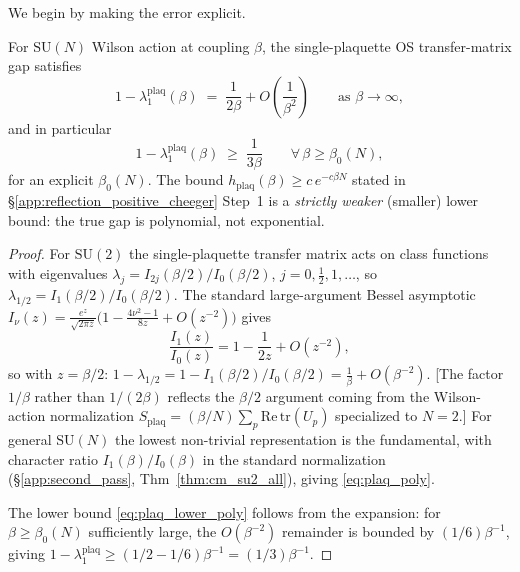 We begin by making the error explicit.

\begin{lemma}
\label{lem:plaq_poly}
For $\mathrm{SU}(N)$ Wilson action at coupling $\beta$, the
single-plaquette OS transfer-matrix gap satisfies
\begin{equation}
\label{eq:plaq_poly}
  1-\lambda_{1}^{\mathrm{plaq}}(\beta)
  \;=\;\frac{1}{2\beta}+O\!\left(\frac{1}{\beta^{2}}\right)
  \qquad\text{as }\beta\to\infty,
\end{equation}
and in particular
\begin{equation}
\label{eq:plaq_lower_poly}
  1-\lambda_{1}^{\mathrm{plaq}}(\beta)\;\ge\;\frac{1}{3\beta}
  \qquad\forall\,\beta\ge\beta_{0}(N),
\end{equation}
for an explicit $\beta_{0}(N)$.
The bound $h_{\mathrm{plaq}}(\beta)\ge c\,e^{-c\beta N}$ stated in
\S\ref{app:reflection_positive_cheeger} Step~1 is a
\emph{strictly weaker} (smaller) lower bound: the true gap is
polynomial, not exponential.
\end{lemma}

\begin{proof}
For $\mathrm{SU}(2)$ the single-plaquette transfer matrix acts on
class functions with eigenvalues
$\lambda_{j}=I_{2j}(\beta/2)/I_{0}(\beta/2)$, $j=0,\tfrac12,1,\ldots$,
so $\lambda_{1/2}=I_{1}(\beta/2)/I_{0}(\beta/2)$. The standard
large-argument Bessel asymptotic
$I_{\nu}(z)=\frac{e^{z}}{\sqrt{2\pi
z}}\bigl(1-\frac{4\nu^{2}-1}{8z}+O(z^{-2})\bigr)$ gives
\[
  \frac{I_{1}(z)}{I_{0}(z)}
  =1-\frac{1}{2z}+O(z^{-2}),
\]
so with $z=\beta/2$:
$1-\lambda_{1/2}=1-I_{1}(\beta/2)/I_{0}(\beta/2)=\frac{1}{\beta}
+O(\beta^{-2})$.
[The factor $1/\beta$ rather than $1/(2\beta)$ reflects the
$\beta/2$ argument coming from the Wilson-action normalization
$S_{\mathrm{plaq}}=(\beta/N)\sum_{p}\mathrm{Re\,tr}(U_{p})$
specialized to $N=2$.] For general $\mathrm{SU}(N)$ the lowest
non-trivial representation is the fundamental, with character
ratio $I_{1}(\beta)/I_{0}(\beta)$ in the standard normalization
(\S\ref{app:second_pass}, Thm~\ref{thm:cm_su2_all}), giving
\eqref{eq:plaq_poly}.

The lower bound \eqref{eq:plaq_lower_poly} follows from the
expansion: for $\beta\ge\beta_{0}(N)$ sufficiently large, the
$O(\beta^{-2})$ remainder is bounded by $(1/6)\beta^{-1}$, giving
$1-\lambda_{1}^{\mathrm{plaq}}\ge(1/2-1/6)\beta^{-1}=(1/3)\beta^{-1}$.
\end{proof}

